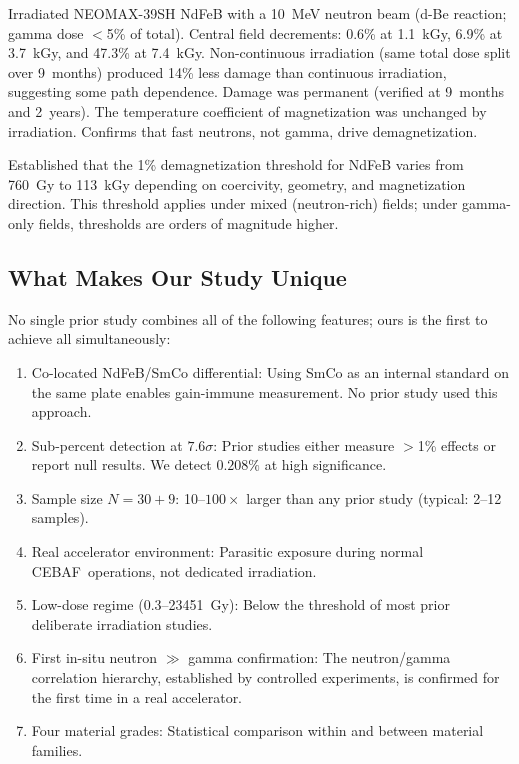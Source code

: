 \documentclass[11pt,letterpaper]{article}
\newcommand{\CEBAF}{CEBAF}
\begin{document}
\begin{description}[style=nextline]
    \item[Miyahara et al.\ \cite{Miyahara}]
    Irradiated NEOMAX-39SH NdFeB with a 10~MeV neutron beam
    (d-Be reaction; gamma dose $<$5\% of total). Central field
    decrements: 0.6\% at \SI{1.1}{kGy}, 6.9\% at \SI{3.7}{kGy},
    and 47.3\% at \SI{7.4}{kGy}. Non-continuous irradiation
    (same total dose split over 9~months) produced 14\% less
    damage than continuous irradiation, suggesting some path
    dependence. Damage was permanent (verified at 9~months and
    2~years). The temperature coefficient of magnetization was
    unchanged by irradiation. Confirms that fast neutrons, not
    gamma, drive demagnetization.

    \item[APS LS-290 \cite{APSLS290}]
    Established that the 1\% demagnetization threshold for NdFeB varies from
    \SI{760}{Gy} to \SI{113}{kGy} depending on coercivity, geometry, and
    magnetization direction. This threshold applies under mixed (neutron-rich)
    fields; under gamma-only fields, thresholds are orders of magnitude higher.
\end{description}

\subsection{What Makes Our Study Unique}

No single prior study combines all of the following features; ours is the
first to achieve all simultaneously:

\begin{enumerate}
    \item Co-located NdFeB/SmCo differential: Using SmCo as an
    internal standard on the same plate enables gain-immune measurement. No
    prior study used this approach.

    \item Sub-percent detection at $7.6\sigma$: Prior studies either
    measure $>$1\% effects or report null results. We detect $0.208\%$ at
    high significance.

    \item Sample size $N = 30 + 9$: 10--$100\times$ larger than any
    prior study (typical: 2--12 samples).

    \item Real accelerator environment: Parasitic exposure during
    normal \CEBAF~operations, not dedicated irradiation.

    \item Low-dose regime (0.3--\SI{23451}{Gy}): Below the threshold
    of most prior deliberate irradiation studies.

    \item First in-situ neutron $\gg$ gamma confirmation: The
    neutron/gamma correlation hierarchy, established by controlled experiments,
    is confirmed for the first time in a real accelerator.

    \item Four material grades: Statistical comparison within and
    between material families.
\end{enumerate}
\end{document}
